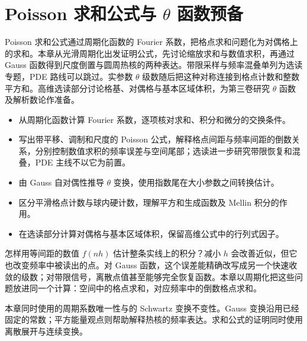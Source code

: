 \chapter{Poisson 求和公式与 \texorpdfstring{\(\theta\)}{\AnalysisPdfTheta} 函数预备}
\label{b2:ch:06}
\begin{chapterabstract}
Poisson 求和公式通过周期化函数的 Fourier 系数，把格点求和问题化为对偶格上的求和。本章从光滑周期化出发证明公式，先讨论缩放求和与数值求积，再通过 Gauss 函数得到尺度倒置与圆周热核的两种表达。带限采样与频率混叠单列为选读专题，PDE 路线可以跳过。实参数 \(\theta\) 级数随后把这种对称连接到格点计数和整数平方和。高维选读部分讨论格基、对偶格与基本区域体积，为第三卷研究 \(\theta\) 函数及解析数论作准备。
\end{chapterabstract}
\begin{learninggoals}
\begin{itemize}
\item\label{b2:item:06-goal-periodic}从周期化函数计算 Fourier 系数，逐项核对求和、积分和微分的交换条件。
\item\label{b2:item:06-goal-scale}写出带平移、调制和尺度的 Poisson 公式，解释格点间距与频率间距的倒数关系，分别控制数值求积的频率误差与空间尾部；选读进一步研究带限恢复和混叠，PDE 主线不以它为前置。
\item\label{b2:item:06-goal-theta}由 Gauss 自对偶性推导 \(\theta\) 变换，使用指数尾在大小参数之间转换估计。
\item\label{b2:item:06-goal-count}区分平滑格点计数与球内硬计数，理解平方和生成函数及 Mellin 积分的作用。
\item\label{b2:item:06-goal-lattice}在选读部分计算对偶格与基本区域体积，保留高维公式中的行列式因子。
\end{itemize}
\end{learninggoals}

怎样用等间距的数值 \(f(nh)\) 估计整条实线上的积分？减小 \(h\) 会改善近似，但它也改变频率中被读出的点。对 Gauss 函数，这个误差能精确改写成另一个快速收敛的级数；对带限信号，离散点值甚至能够完全恢复函数。本章以周期化把这些问题放进同一个计算：空间中的格点求和，对应频率中的倒数格点求和。

\ProseParagraphBreak

本章同时使用的周期系数唯一性与的 Schwartz 变换不变性。Gauss 变换沿用已经固定的常数；平方能量观点则帮助解释热核的频率表达。求和公式的证明同时使用离散展开与连续变换。

